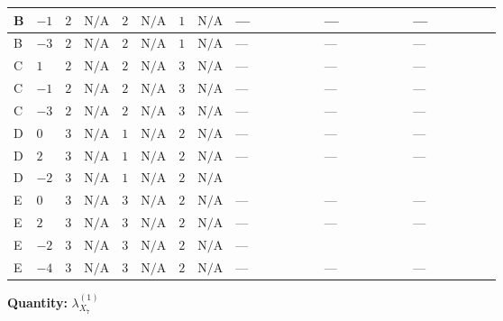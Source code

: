 \documentclass[8pt]{article}
\begin{document}
\begin{landscape}
\begin{longtable}{@{}llcccccc >{\raggedright\arraybackslash}p{0.21\linewidth} >{\raggedright\arraybackslash}p{0.21\linewidth} >{\raggedright\arraybackslash}p{0.21\linewidth}@{}}
\midrule
B & $-1$ & $2$ & $\text{N/A}$ & $2$ & $\text{N/A}$ & $1$ & $\text{N/A}$ & --- & --- & --- \\
\midrule
B & $-3$ & $2$ & $\text{N/A}$ & $2$ & $\text{N/A}$ & $1$ & $\text{N/A}$ & --- & --- & --- \\
\midrule
C & $1$ & $2$ & $\text{N/A}$ & $2$ & $\text{N/A}$ & $3$ & $\text{N/A}$ & --- & --- & --- \\
\midrule
C & $-1$ & $2$ & $\text{N/A}$ & $2$ & $\text{N/A}$ & $3$ & $\text{N/A}$ & --- & --- & --- \\
\midrule
C & $-3$ & $2$ & $\text{N/A}$ & $2$ & $\text{N/A}$ & $3$ & $\text{N/A}$ & --- & --- & --- \\
\midrule
D & $0$ & $3$ & $\text{N/A}$ & $1$ & $\text{N/A}$ & $2$ & $\text{N/A}$ & --- & --- & --- \\
\midrule
D & $2$ & $3$ & $\text{N/A}$ & $1$ & $\text{N/A}$ & $2$ & $\text{N/A}$ & --- & --- & --- \\
\midrule
D & $-2$ & $3$ & $\text{N/A}$ & $1$ & $\text{N/A}$ & $2$ & $\text{N/A}$ & \scriptsize\adjustbox{max width=\linewidth}{$\begin{gathered} 24 {\lambda_{X_{1}}} \left({\lambda_{X_{7}}^{(1)}}\right)^{*}\end{gathered}$} & \scriptsize\adjustbox{max width=\linewidth}{$\begin{gathered} -12 {g_2}^2 {\lambda_{X_{7}}^{(1)}}\end{gathered}$} & \scriptsize\adjustbox{max width=\linewidth}{$\begin{gathered} -6 {g_1}^2 {\lambda_{X_{7}}^{(1)}}\end{gathered}$} \\
\midrule
E & $0$ & $3$ & $\text{N/A}$ & $3$ & $\text{N/A}$ & $2$ & $\text{N/A}$ & --- & --- & --- \\
\midrule
E & $2$ & $3$ & $\text{N/A}$ & $3$ & $\text{N/A}$ & $2$ & $\text{N/A}$ & --- & --- & --- \\
\midrule
E & $-2$ & $3$ & $\text{N/A}$ & $3$ & $\text{N/A}$ & $2$ & $\text{N/A}$ & --- & \scriptsize\adjustbox{max width=\linewidth}{$\begin{gathered} -24 {g_2}^2 {\lambda_{X_{7}}^{(1)}}\end{gathered}$} & \scriptsize\adjustbox{max width=\linewidth}{$\begin{gathered} -6 {g_1}^2 {\lambda_{X_{7}}^{(1)}}\end{gathered}$} \\
\midrule
E & $-4$ & $3$ & $\text{N/A}$ & $3$ & $\text{N/A}$ & $2$ & $\text{N/A}$ & --- & --- & --- \\
\midrule
\bottomrule
\end{longtable}
\clearpage
\noindent\textbf{Quantity: }${\lambda_{X_{7}}^{(1)}}$\par\smallskip

\end{landscape}
\end{document}
